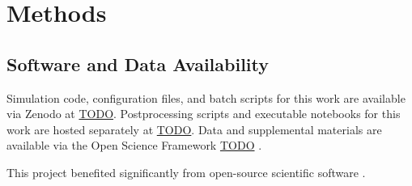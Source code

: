 \section{Methods} \label{sec:methods}

\subsection{Software and Data Availability} \label{sec:materials}

Simulation code, configuration files, and batch scripts for this work are available via Zenodo at \url{TODO}.
Postprocessing scripts and executable notebooks for this work are hosted separately at \url{TODO}.
Data and supplemental materials are available via the Open Science Framework \url{TODO} \citep{foster2017open}.

This project benefited significantly from open-source scientific software \citep{2020SciPy-NMeth,harris2020array,reback2020pandas,mckinney-proc-scipy-2010,waskom2021seaborn,hunter2007matplotlib,moreno2023teeplot}.
